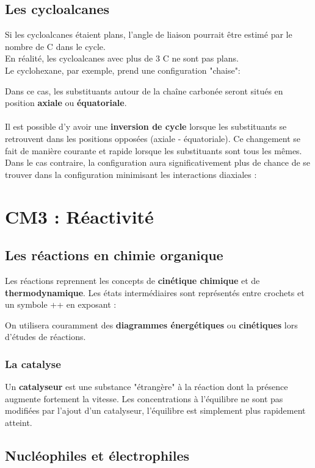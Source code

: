 \documentclass{article}
\newcommand{\insertslide}[2]{
\begin{center}
    \fbox{\texttt{[image: \#1]}}
\end{center}
}
\begin{document}
    \subsection{Les cycloalcanes}
        Si les cycloalcanes étaient plans, l'angle de liaison pourrait être estimé par le nombre de C dans le cycle.\\
        En réalité, les cycloalcanes avec plus de 3 C ne sont pas plans.\\
        Le cyclohexane, par exemple, prend une configuration "chaise":
        \insertslide{Slides/CM2}{65}
        Dans ce cas, les substituants autour de la chaîne carbonée seront situés en position \textbf{axiale} ou \textbf{équatoriale}.\\\\
        Il est possible d'y avoir une \textbf{inversion de cycle} lorsque les substituants se retrouvent dans les positions opposées (axiale - équatoriale).
        Ce changement se fait de manière courante et rapide lorsque les substituants sont tous les mêmes.\\
        Dans le cas contraire, la configuration aura significativement plus de chance de se trouver dans la configuration minimisant les interactions diaxiales :
        \insertslide{Slides/CM2}{70}
\pagebreak
\section{CM3 : Réactivité}
    \subsection{Les réactions en chimie organique}
        Les réactions reprennent les concepts de \textbf{cinétique chimique} et de \textbf{thermodynamique}.
        Les états intermédiaires sont représentés entre crochets et un symbole ++ en exposant :
        \insertslide{Slides/CM3}{4}
        On utilisera couramment des \textbf{diagrammes énergétiques} ou \textbf{cinétiques} lors d'études de réactions.
        \subsubsection{La catalyse}
        Un \textbf{catalyseur} est une substance "étrangère" à la réaction dont la présence augmente fortement la vitesse.
        Les concentrations à l'équilibre ne sont pas modifiées par l'ajout d'un catalyseur, l'équilibre est simplement plus rapidement atteint.
    \subsection{Nucléophiles et électrophiles}
\end{document}
